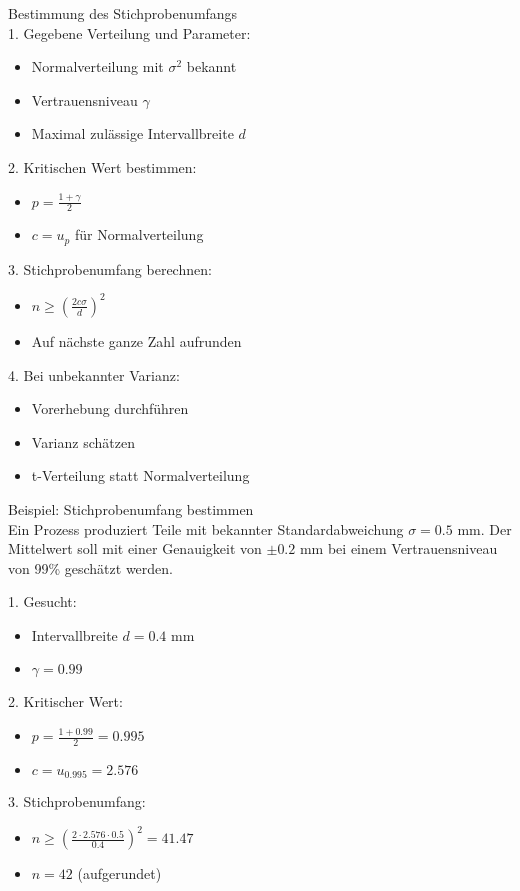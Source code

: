 \begin{KR}{Bestimmung des Stichprobenumfangs}\\
1. Gegebene Verteilung und Parameter:
   \begin{itemize}
     \item Normalverteilung mit $\sigma^2$ bekannt
     \item Vertrauensniveau $\gamma$
     \item Maximal zulässige Intervallbreite $d$
   \end{itemize}

2. Kritischen Wert bestimmen:
   \begin{itemize}
     \item $p = \frac{1+\gamma}{2}$
     \item $c = u_p$ für Normalverteilung
   \end{itemize}

3. Stichprobenumfang berechnen:
   \begin{itemize}
     \item $n \geq (\frac{2c\sigma}{d})^2$
     \item Auf nächste ganze Zahl aufrunden
   \end{itemize}

4. Bei unbekannter Varianz:
   \begin{itemize}
     \item Vorerhebung durchführen
     \item Varianz schätzen
     \item t-Verteilung statt Normalverteilung
   \end{itemize}
\end{KR}

\begin{example2}{Beispiel: Stichprobenumfang bestimmen}\\
Ein Prozess produziert Teile mit bekannter Standardabweichung $\sigma = 0.5$ mm. Der Mittelwert soll mit einer Genauigkeit von $\pm 0.2$ mm bei einem Vertrauensniveau von 99\% geschätzt werden.

1. Gesucht:
   \begin{itemize}
     \item Intervallbreite $d = 0.4$ mm
     \item $\gamma = 0.99$
   \end{itemize}

2. Kritischer Wert:
   \begin{itemize}
     \item $p = \frac{1+0.99}{2} = 0.995$
     \item $c = u_{0.995} = 2.576$
   \end{itemize}

3. Stichprobenumfang:
   \begin{itemize}
     \item $n \geq (\frac{2 \cdot 2.576 \cdot 0.5}{0.4})^2 = 41.47$
     \item $n = 42$ (aufgerundet)
   \end{itemize}
\end{example2}